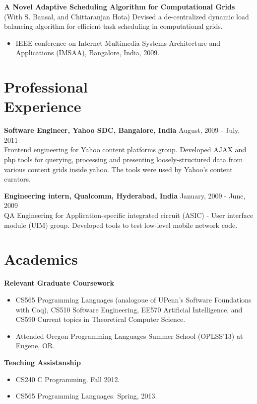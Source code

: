\documentclass[margin,line]{res}
\begin{document}
\begin{resume}
{\bf A Novel Adaptive Scheduling Algorithm for Computational Grids}\\
(With S. Bansal, and Chittaranjan Hota) Devised a de-centralized
dynamic load balancing algorithm for efficient task scheduling in
computational grids.
 \begin{itemize} \itemsep -2pt  %
 \item IEEE conference on Internet Multimedia Systems Architecture and
 Applications (IMSAA), Bangalore, India, 2009.
 \end{itemize}

\section{Professional \\ Experience}
{\bf Software Engineer, Yahoo SDC, Bangalore, India} \hfill August, 2009 -
July, 2011\\
Frontend engineering for Yahoo content platforms group. Developed AJAX
and php tools for querying, processing and presenting
loosely-structured data from various content grids inside yahoo. The
tools were used by Yahoo's content curators.

{\bf Engineering intern, Qualcomm, Hyderabad, India} \hfill January,
2009 - June, 2009\\
QA Engineering for Application-specific integrated circuit (ASIC) -
User interface module (UIM) group. Developed tools to test low-level
mobile network code.

\section{Academics}
{\bf Relevant Graduate Coursework }\\
\begin{itemize}
\item CS565 Programming Languages (analogoue of UPenn's Software
Foundations with Coq), CS510 Software Engineering, EE570 Artificial
Intelligence, and CS590 Current topics in Theoretical Computer
Science.
\item Attended Oregon Programming Languages Summer School (OPLSS'13)
at Eugene, OR.
\end{itemize}

{\bf Teaching Assistanship}\\
\begin{itemize}
\item CS240 C Programming. Fall 2012.
\item CS565 Programming Languages. Spring, 2013.
\end{itemize}


\end{resume}
\end{document}
